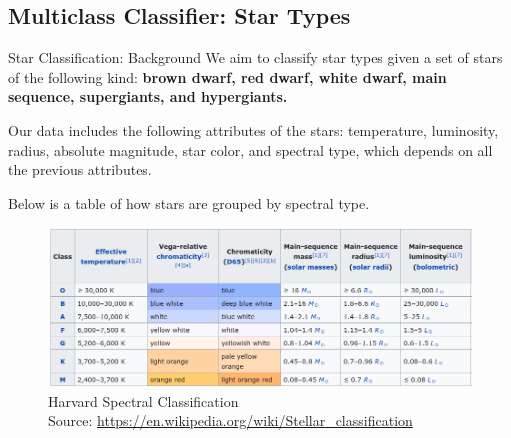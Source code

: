 \documentclass[9pt]{beamer}
\begin{document}
\subsection{Multiclass Classifier: Star Types}
\frame{\subsectionpage}
\begin{frame}{Star Classification: Background}
    We aim to classify star types given a set of stars of the following kind: \textbf{brown dwarf, red dwarf, white dwarf, main sequence, supergiants, and hypergiants.}
    
    Our data includes the following attributes of the stars: temperature, luminosity, radius, absolute magnitude, star color, and spectral type, which depends on all the previous attributes.
    
    Below is a table of how stars are grouped by spectral type.
    \begin{figure}
        \includegraphics[scale=0.30]{latent_spectral.png}
        \caption{Harvard Spectral Classification \\ 
        Source: \url{https://en.wikipedia.org/wiki/Stellar_classification}}
        \label{fig:latent_spectral_relation}
    \end{figure}
\end{frame}
\end{document}
